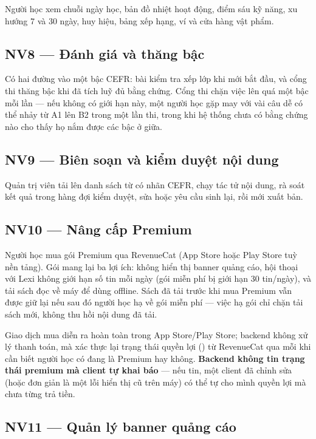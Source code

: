 Người học xem chuỗi ngày học, bản đồ nhiệt hoạt động, điểm sáu kỹ năng, xu hướng 7 và
30 ngày, huy hiệu, bảng xếp hạng, ví và cửa hàng vật phẩm.

\subsection{NV8 — Đánh giá và thăng bậc}

Có hai đường vào một bậc CEFR: bài kiểm tra xếp lớp khi mới bắt đầu, và cổng thi thăng bậc
khi đã tích luỹ đủ bằng chứng. Cổng thi chặn việc lên quá một bậc mỗi lần — nếu không có
giới hạn này, một người học gặp may với vài câu dễ có thể nhảy từ A1 lên B2 trong một lần
thi, trong khi hệ thống chưa có bằng chứng nào cho thấy họ nắm được các bậc ở giữa.

\subsection{NV9 — Biên soạn và kiểm duyệt nội dung}

Quản trị viên tải lên danh sách từ có nhãn CEFR, chạy tác tử nội dung, rà soát kết quả
trong hàng đợi kiểm duyệt, sửa hoặc yêu cầu sinh lại, rồi mới xuất bản.

\subsection{NV10 — Nâng cấp Premium}

Người học mua gói Premium qua RevenueCat (App Store hoặc Play Store tuỳ nền tảng). Gói
mang lại ba lợi ích: không hiển thị banner quảng cáo, hội thoại với Lexi không giới hạn số
tin mỗi ngày (gói miễn phí bị giới hạn 30 tin/ngày), và tải sách đọc về máy để dùng offline.
Sách đã tải trước khi mua Premium vẫn được giữ lại nếu sau đó người học hạ về gói miễn phí —
việc hạ gói chỉ chặn tải sách mới, không thu hồi nội dung đã tải.

Giao dịch mua diễn ra hoàn toàn trong App Store/Play Store; backend không xử lý thanh toán,
mà xác thực lại trạng thái quyền lợi () từ RevenueCat qua
 mỗi khi cần biết người học có đang là Premium hay không.
\textbf{Backend không tin trạng thái premium mà client tự khai báo} — nếu tin, một client
đã chỉnh sửa (hoặc đơn giản là một lỗi hiển thị cũ trên máy) có thể tự cho mình quyền lợi
mà chưa từng trả tiền.

\subsection{NV11 — Quản lý banner quảng cáo}

